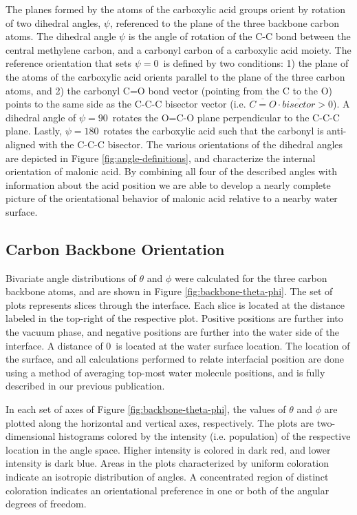 The planes formed by the atoms of the carboxylic acid groups orient by rotation of two dihedral angles, $\psi$, referenced to the plane of the three backbone carbon atoms. The dihedral angle $\psi$ is the angle of rotation of the C-C bond between the central methylene carbon, and a carbonyl carbon of a carboxylic acid moiety. The reference orientation that sets $\psi=0$\textdegree~is defined by two conditions: 1) the plane of the atoms of the carboxylic acid orients parallel to the plane of the three carbon atoms, and 2) the carbonyl C=O bond vector (pointing from the C to the O) points to the same side as the C-C-C bisector vector (i.e. $\overline{C=O} \cdot \overline{bisector} > 0$). A dihedral angle of $\psi=90$\textdegree~rotates the O=C-O plane perpendicular to the C-C-C plane. Lastly, $\psi=180$\textdegree~rotates the carboxylic acid such that the carbonyl is anti-aligned with the C-C-C bisector. The various orientations of the dihedral angles are depicted in Figure \ref{fig:angle-definitions}, and characterize the internal orientation of malonic acid. By combining all four of the described angles with information about the acid position we are able to develop a nearly complete picture of the orientational behavior of malonic acid relative to a nearby water surface.


\subsection {Carbon Backbone Orientation}

Bivariate angle distributions of $\theta$ and $\phi$ were calculated for the three carbon backbone atoms, and are shown in Figure \ref{fig:backbone-theta-phi}. The set of plots represents slices through the interface. Each slice is located at the distance labeled in the top-right of the respective plot. Positive positions are further into the vacuum phase, and negative positions are further into the water side of the interface. A distance of 0\angs~is located at the water surface location. The location of the surface, and all calculations performed to relate interfacial position are done using a method of averaging top-most water molecule positions, and is fully described in our previous publication.\cite{Shamay2011}

In each set of axes of Figure \ref{fig:backbone-theta-phi}, the values of $\theta$ and $\phi$ are plotted along the horizontal and vertical axes, respectively. The plots are two-dimensional histograms colored by the intensity (i.e. population) of the respective location in the angle space. Higher intensity is colored in dark red, and lower intensity is dark blue. Areas in the plots characterized by uniform coloration indicate an isotropic distribution of angles. A concentrated region of distinct coloration indicates an orientational preference in one or both of the angular degrees of freedom.

